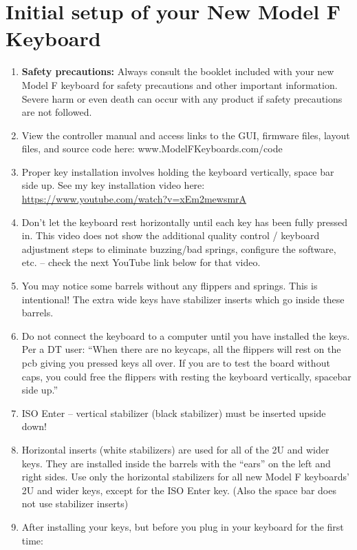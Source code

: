 \documentclass[a5paper, twoside]{memoir}
\begin{document}
\chapter{Initial setup of your New Model F Keyboard}

\begin{enumerate}

\item \textbf{Safety precautions:}  Always consult the booklet included with your new Model F keyboard for safety precautions and other important information.  Severe harm or even death can occur with any product if safety precautions are not followed.
\item View the controller manual and access links to the GUI, firmware files, layout files, and source code here:  www.ModelFKeyboards.com/code
\item Proper key installation involves holding the keyboard vertically, space bar side up.  See my key installation video here:  \url{https://www.youtube.com/watch?v=xEm2mewsmrA}
\item Don’t let the keyboard rest horizontally until each key has been fully pressed in. This video does not show the additional quality control / keyboard adjustment steps to eliminate buzzing/bad springs, configure the software, etc. – check the next YouTube link below for that video.
\item You may notice some barrels without any flippers and springs.  This is intentional!  The extra wide keys have stabilizer inserts which go inside these barrels.
\item Do not connect the keyboard to a computer until you have installed the keys.  Per a DT user:  “When there are no keycaps, all the flippers will rest on the pcb giving you pressed keys all over. If you are to test the board without caps, you could free the flippers with resting the keyboard vertically, spacebar side up.”
\item ISO Enter – vertical stabilizer (black stabilizer) must be inserted upside down! 
\item Horizontal inserts (white stabilizers) are used for all of the 2U and wider keys.  They are installed inside the barrels with the “ears” on the left and right sides.  Use only the horizontal stabilizers for all new Model F keyboards’ 2U and wider keys, except for the ISO Enter key.  (Also the space bar does not use stabilizer inserts)
\item After installing your keys, but before you plug in your keyboard for the first time:
\begin{itemize}

\end{itemize}
\end{enumerate}
\end{document}
